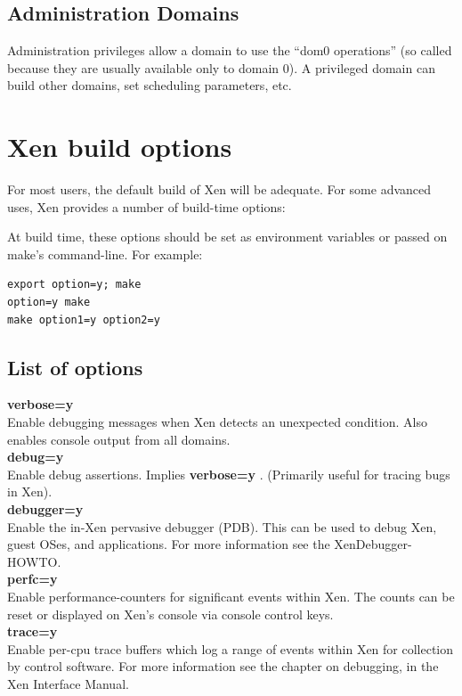 \documentclass[11pt,twoside,final,openright]{xenstyle}
\begin{document}
{\section{Administration Domains}

Administration privileges allow a domain to use the ``dom0
operations'' (so called because they are usually available only to
domain 0).  A privileged domain can build other domains, set scheduling
parameters, etc.


\chapter{Xen build options}

For most users, the default build of Xen will be adequate.  For some
advanced uses, Xen provides a number of build-time options:

At build time, these options should be set as environment variables or
passed on make's command-line.  For example:

\begin{verbatim}
export option=y; make
option=y make
make option1=y option2=y
\end{verbatim}

\section{List of options}

{\bf verbose=y }\\
Enable debugging messages when Xen detects an unexpected condition.
Also enables console output from all domains. \\
{\bf debug=y }\\
Enable debug assertions.  Implies {\bf verbose=y }.
(Primarily useful for tracing bugs in Xen).        \\
{\bf debugger=y }\\
Enable the in-Xen pervasive debugger (PDB).
This can be used to debug Xen, guest OSes, and
applications. For more information see the 
XenDebugger-HOWTO.                                 \\
{\bf perfc=y }\\
Enable performance-counters for significant events
within Xen. The counts can be reset or displayed
on Xen's console via console control keys.          \\
{\bf trace=y }\\
Enable per-cpu trace buffers which log a range of
events within Xen for collection by control
software.  For more information see the chapter on debugging,
in the Xen Interface Manual.

}
\end{document}
